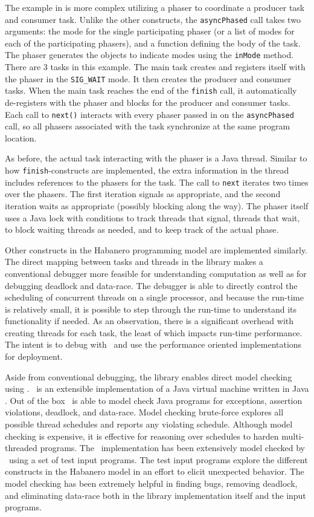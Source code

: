 The example in  is more complex utilizing a
phaser to coordinate a producer task and consumer task. Unlike the
other constructs, the \texttt{asyncPhased} call takes two arguments:
the mode for the single participating phaser (or a list of modes for each of the
participating phasers), and a function defining the body of the
task. The phaser generates the objects to indicate modes using the
\texttt{inMode} method. There are 3 tasks in this example. The main
task creates and registers itself with the phaser in the
\texttt{SIG\_WAIT} mode. It then creates the producer and consumer
tasks. When the main task reaches the end of the \texttt{finish} call,
it automatically de-registers with the phaser and blocks for the
producer and consumer tasks. Each call to \texttt{next()} interacts
with every phaser passed in on the \texttt{asyncPhased} call, so all
phasers associated with the task synchronize at the same program location.

As before, the actual task interacting with the phaser is a Java
thread. Similar to how \texttt{finish}-constructs are implemented, the
extra information in the thread includes references to the phasers
for the task. The call to \texttt{next} iterates two times over the
phasers. The first iteration signals as appropriate, and the
second iteration waits as appropriate (possibly blocking along the way). The phaser itself
uses a Java lock with conditions to track threads that signal, threads
that wait, to block waiting threads as needed, and to keep track of the actual phase.

Other constructs in the Habanero programming model are implemented
similarly. The direct mapping between tasks and threads in the library
makes a conventional debugger more feasible for understanding
computation as well as for debugging deadlock and data-race. The debugger is able
to directly control the scheduling of concurrent threads on a single
processor, and because the run-time is relatively small, it is
possible to step through the run-time to understand its functionality
if needed. As an observation, there is a significant overhead with
creating threads for each task, the least of which impacts run-time
performance. The intent is to debug with \hjv\ and use the performance
oriented implementations for deployment.

Aside from conventional debugging, the library enables direct model
checking using \jpf. \jpf\ is an extensible implementation of a Java
virtual machine written in Java
\cite{Visser:2003:MCP:641151.641186}. Out of the box \jpf\ is able to
model check Java programs for exceptions, assertion violations,
deadlock, and data-race. Model checking brute-force explores all possible thread schedules and reports any violating schedule.  Although model checking is expensive, it
is effective for reasoning over schedules to harden
multi-threaded programs. The \hjv\ implementation has been
extensively model checked by \jpf\ using a set of test input
programs. The test input programs explore the different constructs in
the Habanero model in an effort to elicit unexpected behavior. The
model checking has been extremely helpful in finding bugs, removing
deadlock, and eliminating data-race both in the library implementation
itself and the input programs.

